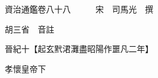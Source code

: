 










 


 
 


 

  
  
  
  
  





  
  
  
  
  
 
  

  

  
  
  



  

 
 

  
   




  

  
  


  　　資治通鑑卷八十八　　　宋　司馬光　撰

　　胡三省　音註

　　晉紀十【起玄黓涒灘盡昭陽作噩凡二年】

　　孝懷皇帝下

